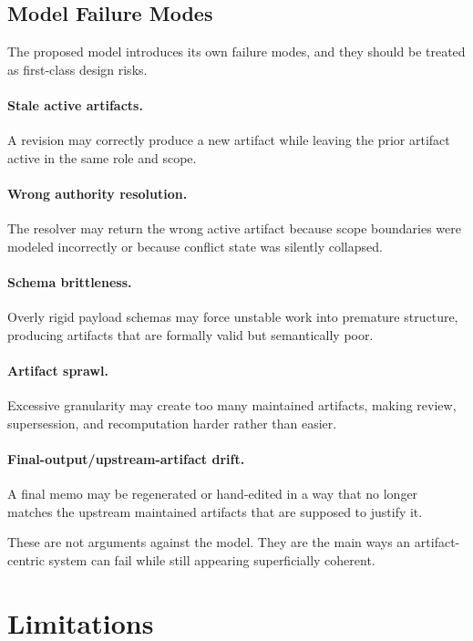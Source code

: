 \documentclass{article}
\begin{document}
\subsection{Model Failure Modes}

The proposed model introduces its own failure modes, and they should be treated as first-class design risks.

\paragraph{Stale active artifacts.} A revision may correctly produce a new artifact while leaving the prior artifact active in the same role and scope.

\paragraph{Wrong authority resolution.} The resolver may return the wrong active artifact because scope boundaries were modeled incorrectly or because conflict state was silently collapsed.

\paragraph{Schema brittleness.} Overly rigid payload schemas may force unstable work into premature structure, producing artifacts that are formally valid but semantically poor.

\paragraph{Artifact sprawl.} Excessive granularity may create too many maintained artifacts, making review, supersession, and recomputation harder rather than easier.

\paragraph{Final-output/upstream-artifact drift.} A final memo may be regenerated or hand-edited in a way that no longer matches the upstream maintained artifacts that are supposed to justify it.

These are not arguments against the model. They are the main ways an artifact-centric system can fail while still appearing superficially coherent.

\section{Limitations}
\end{document}
